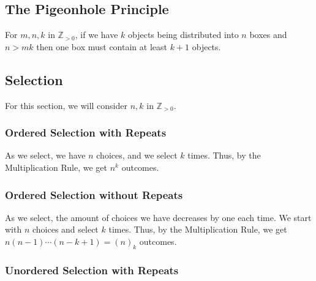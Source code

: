 \subsection{The Pigeonhole Principle}

For $m, n, k$ in $\mathbb{Z}_{> 0}$, if we have $k$ objects being 
distributed into $n$ boxes and $n > mk$ then one box must contain
at least $k + 1$ objects.

\subsection{Selection}

For this section, we will consider $n, k$ in $\mathbb{Z}_{> 0}$.

\subsubsection{Ordered Selection with Repeats}

As we select, we have $n$ choices, and we select $k$ times. Thus,
by the Multiplication Rule, we get $n^k$ outcomes.

\subsubsection{Ordered Selection without Repeats}

As we select, the amount of choices we have decreases by one each time.
We start with $n$ choices and select $k$ times. Thus, by the Multiplication
Rule, we get \newline $n(n-1)\cdots(n-k+1) = (n)_k$ outcomes.

\subsubsection{Unordered Selection with Repeats}

